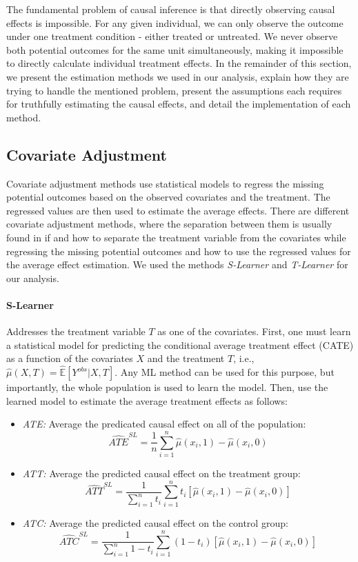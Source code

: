 \documentclass{article}
\begin{document}
The fundamental problem of causal inference is that directly observing causal effects is impossible. For any given individual, we can only observe the outcome under one treatment condition - either treated or untreated. We never observe both potential outcomes for the same unit simultaneously, making it impossible to directly calculate individual treatment effects. In the remainder of this section, we present the estimation methods we used in our analysis, explain how they are trying to handle the mentioned problem, present the assumptions each requires for truthfully estimating the causal effects, and detail the implementation of each method.

\subsection{Covariate Adjustment}
Covariate adjustment methods use statistical models to regress the missing potential outcomes based on the observed covariates and the treatment. The regressed values are then used to estimate the average effects.
There are different covariate adjustment methods, where the separation between them is usually found in if and how to separate the treatment variable from the covariates while regressing the missing potential outcomes and how to use the regressed values for the average effect estimation. We used the methods \emph{S-Learner} and \emph{T-Learner} for our analysis.
\paragraph{S-Learner} Addresses the treatment variable $T$ as one of the covariates. First, one must learn a statistical model for predicting the conditional average treatment effect (CATE) as a function of the covariates $X$ and the treatment $T$, i.e., $\hat{\mu}(X, T) = \hat{\mathbb{E}}[Y^{obs} | X, T]$. Any ML method can be used for this purpose, but importantly, the whole population is used to learn the model. Then, use the learned model to estimate the average treatment effects as follows:

\begin{itemize}
    \item \textit{ATE:} Average the predicated causal effect on all of the population:
    \[
    \widehat{ATE}^{SL} = \frac{1}{n} \sum_{i=1}^{n} \hat{\mu}(x_i, 1) - \hat{\mu}(x_i, 0)
    \]
    \item \textit{ATT:} Average the predicted causal effect on the treatment group:
    \[
    \widehat{ATT}^{SL} = \frac{1}{\sum_{i=1}^{n} t_i} \sum_{i=1}^{n} t_i \left[ \hat{\mu}(x_i, 1) - \hat{\mu}(x_i, 0) \right] 
    \]
    \item \textit{ATC:} Average the predicted causal effect on the control group:
    \[
    \widehat{ATC}^{SL} = \frac{1}{\sum_{i=1}^{n} 1 - t_i} \sum_{i=1}^{n} (1 - t_i) \left[ \hat{\mu}(x_i, 1) - \hat{\mu}(x_i, 0) \right]
    \]
\end{itemize}
\end{document}
